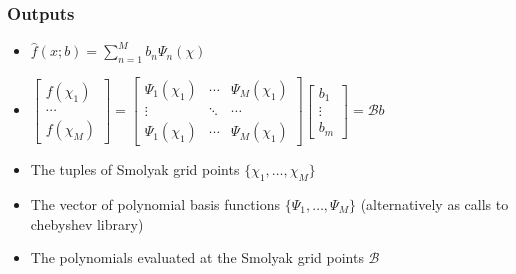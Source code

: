 \documentclass[tikz]{beamer}
\begin{document}

\begin{frame}
  \frametitle{Outputs}
  \begin{itemize}
  \item $\hat{f}(x;b)=\sum_{n=1}^M b_n \Psi_n(\chi)$
  \item $
    \begin{bmatrix}
      f(\chi_1)\\ \cdots \\       f(\chi_M)
    \end{bmatrix}=
      \begin{bmatrix}
        \Psi_1(\chi_1) &\cdots &        \Psi_M(\chi_1)\\
\vdots&\ddots&\cdots\\
        \Psi_1(\chi_1)& \cdots   &      \Psi_M(\chi_1)
      \end{bmatrix}
      \begin{bmatrix}
        b_1\\ \vdots \\ b_m
      \end{bmatrix}= \mathcal{B} b
$
  \item The tuples of Smolyak grid points $\{\chi_1, \ldots , \chi_M\}$
  \item The vector of polynomial basis functions $\{\Psi_1, \ldots , \Psi_M\}$ (alternatively as calls to chebyshev library)
  \item The polynomials evaluated at the Smolyak grid points $\mathcal{B}$
  \end{itemize}
\end{frame}
\end{document}
